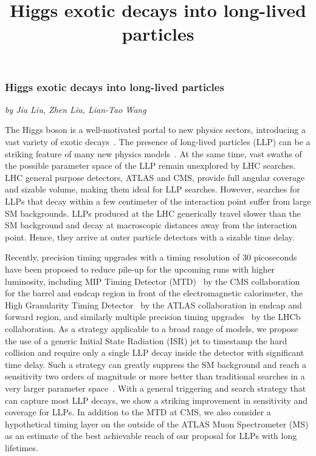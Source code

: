 \title{
Higgs exotic decays into long-lived particles
}



\subsubsection{Higgs exotic decays into long-lived particles}
\begin{center}{\it by Jia Liu, Zhen Liu, Lian-Tao Wang}
\end{center}


The Higgs boson is a well-motivated portal to new physics sectors, introducing a vast variety of exotic decays~\cite{Curtin:2013fra}.
The presence of long-lived particles (LLP) can be a striking feature of many new physics models~\cite{Liu:2018wte,Barbier:2004ez,Giudice:1998bp,Meade:2010ji,Arvanitaki:2012ps,ArkaniHamed:2012gw,Liu:2015bma,Chacko:2005pe, Burdman:2006tz,Kang:2008ea,Craig:2015pha, Davoli:2017swj}. 
At the same time, vast swaths of the possible parameter space of the LLP remain unexplored by LHC searches.
LHC general purpose detectors, ATLAS and CMS, provide full angular coverage and sizable volume, making them ideal for LLP searches.
However, searches for LLPs that decay within a few centimeter of the interaction point suffer from large SM backgrounds. 
LLPs produced at the LHC generically travel slower than the SM background and decay at macroscopic distances away from the interaction point. Hence, they arrive at outer particle detectors with a sizable time delay. 

Recently, precision timing upgrades with a timing resolution of 30 picoseconds have been proposed to reduce pile-up for the upcoming 
runs with higher luminosity, including MIP Timing Detector (MTD)~\cite{Collaboration:2296612}  by the CMS collaboration for 
the barrel and endcap region in front of the electromagnetic calorimeter, the High Granularity Timing Detector~\cite{Allaire:2018bof} 
by the ATLAS collaboration in endcap and forward region,  and similarly multiple precision timing upgrades~\cite{Bediaga:2018lhg} by the 
LHCb collaboration.
As a strategy applicable to a broad range of models, we propose the use of a generic Initial State Radiation (ISR) jet to timestamp the hard collision and require only a single LLP decay inside the detector with significant time delay. Such a strategy can greatly suppress the SM background and 
reach a sensitivity two orders of magnitude or more better than traditional searches in a very larger parameter space~\cite{Aad:2015uaa, CMS:2014wda,Coccaro:2016lnz, Liu:2015bma}. 
With a general triggering and search strategy that can capture most LLP decays, 
we show a striking improvement in sensitivity and coverage for LLPs. In addition to the MTD at CMS, we also consider a hypothetical timing layer on the outside of the ATLAS Muon Spectrometer (MS) as an estimate of the best achievable reach of our proposal for LLPs with long lifetimes.  \\

